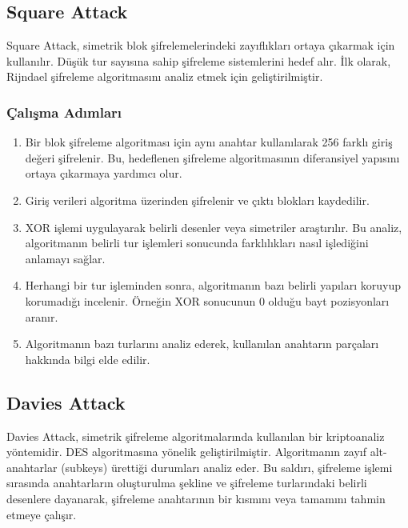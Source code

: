 \newpage

\subsection{Square Attack}

Square Attack, simetrik blok şifrelemelerindeki zayıflıkları ortaya çıkarmak için kullanılır. Düşük tur sayısına sahip şifreleme sistemlerini hedef alır. İlk olarak, Rijndael şifreleme algoritmasını analiz etmek için geliştirilmiştir.

\subsubsection{Çalışma Adımları}

\begin{enumerate}
    \item Bir blok şifreleme algoritması için aynı anahtar kullanılarak 256 farklı giriş değeri şifrelenir. Bu, hedeflenen şifreleme algoritmasının diferansiyel yapısını ortaya çıkarmaya yardımcı olur.
    \item Giriş verileri algoritma üzerinden şifrelenir ve çıktı blokları kaydedilir.
    \item XOR işlemi uygulayarak belirli desenler veya simetriler araştırılır. Bu analiz, algoritmanın belirli tur işlemleri sonucunda farklılıkları nasıl işlediğini anlamayı sağlar.
    \item Herhangi bir tur işleminden sonra, algoritmanın bazı belirli yapıları koruyup korumadığı incelenir. Örneğin XOR sonucunun 0 olduğu bayt pozisyonları aranır.
    \item Algoritmanın bazı turlarını analiz ederek, kullanılan anahtarın parçaları hakkında bilgi elde edilir.
\end{enumerate}

\newpage

\subsection{Davies Attack}

Davies Attack, simetrik şifreleme algoritmalarında kullanılan bir kriptoanaliz yöntemidir. DES algoritmasına yönelik geliştirilmiştir. Algoritmanın zayıf alt-anahtarlar (subkeys) ürettiği durumları analiz eder. Bu saldırı, şifreleme işlemi sırasında anahtarların oluşturulma şekline ve şifreleme turlarındaki belirli desenlere dayanarak, şifreleme anahtarının bir kısmını veya tamamını tahmin etmeye çalışır.


